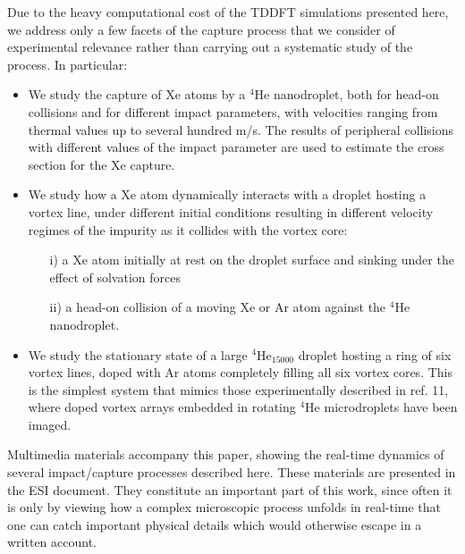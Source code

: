 		Due to the heavy computational cost of the TDDFT simulations presented here, we address only a few facets of the capture process that we consider of experimental relevance rather than carrying out a systematic study of the process. In particular:
		\begin{itemize}
			\item We study the capture of Xe atoms by a $^4$He nanodroplet, both for head-on collisions and for different impact parameters, with velocities ranging from thermal values up to several hundred m/s. The results of peripheral collisions with different values of the impact parameter are used to estimate the cross section for the Xe capture.
			\item We study how a Xe atom dynamically interacts with a droplet hosting a vortex line, under different initial conditions resulting in different velocity regimes of the impurity as it collides with the vortex core: 
			\begin{enumerate}
				\item[i)] a Xe atom initially at rest on the droplet surface and sinking under the effect of solvation forces
				\item[ii)] a head-on collision of a moving Xe or Ar atom against the $^4$He nanodroplet.	
			\end{enumerate}
			\item We study the stationary state of a large $^4$He$_{15000}$ droplet hosting a ring of six vortex lines, doped with Ar atoms completely filling all six vortex cores. This is the simplest system that mimics those experimentally described in ref. 11, where doped vortex arrays embedded in rotating $^4$He microdroplets have been imaged.
		\end{itemize}

		Multimedia materials accompany this paper, showing the real-time dynamics of several impact/capture processes described here. These materials are presented in the ESI document. They constitute an important part of this work, since often it is only by viewing how a complex microscopic process unfolds in real-time that one can catch important physical details which would otherwise escape in a written account.